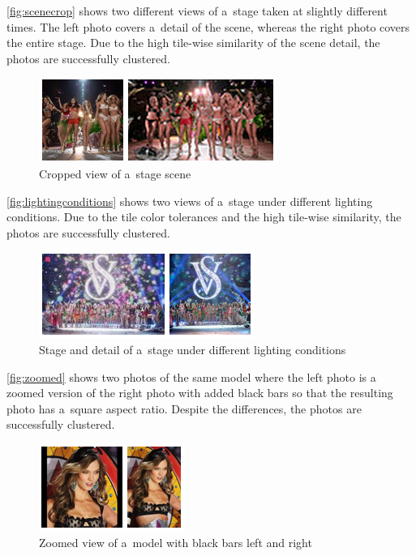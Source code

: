 \autoref{fig:scenecrop} shows two different views of a~stage
taken at slightly different times.
The left photo covers a~detail of the scene,
whereas the right photo covers the entire stage.
Due to the high tile-wise similarity of the scene detail,
the photos are successfully clustered.

\begin{figure}[h!]
  \centering
  \includegraphics[width=0.5\linewidth]{./scene.png}
  \caption{Cropped view of a~stage scene}
  \label{fig:scenecrop}
\end{figure}

\autoref{fig:lightingconditions} shows two views of a~stage
under different lighting conditions.
Due to the tile color tolerances and the high tile-wise similarity,
the photos are successfully clustered.

\begin{figure}[h!]
  \centering
  \includegraphics[width=0.5\linewidth]{./viewing_angle.png}
  \caption{Stage and detail of a~stage under different lighting conditions}
  \label{fig:lightingconditions}
\end{figure}

\autoref{fig:zoomed} shows two photos of the same model
where the left photo is a zoomed version of the right photo 
with added black bars so that the resulting photo
has a~square aspect ratio.
Despite the differences, the photos are successfully clustered.

\begin{figure}[h!]
  \centering
  \includegraphics[width=0.35\linewidth]{./zoom.png}
  \caption{Zoomed view of a~model with black bars left and right}
  \label{fig:zoomed}
\end{figure}

